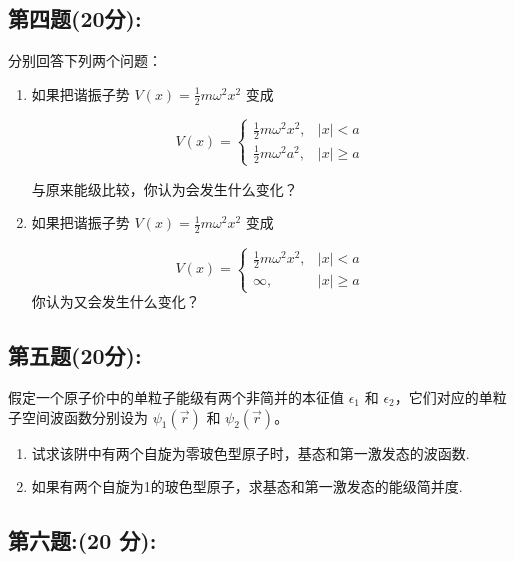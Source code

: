 \subsection{第四题(20分):}
分别回答下列两个问题：

\begin{enumerate}
    \item  如果把谐振子势 $V(x) = \frac{1}{2} m \omega^2 x^2$ 变成

    \[
    V(x) =
    \begin{cases}
    \frac{1}{2} m \omega^2 x^2, & |x| < a \\
    \frac{1}{2} m \omega^2 a^2, & |x| \geq a
    \end{cases}~
    \]

    与原来能级比较，你认为会发生什么变化？

    \item  如果把谐振子势 $V(x) = \frac{1}{2} m \omega^2 x^2$ 变成

    \[
    V(x) =
    \begin{cases}
    \frac{1}{2} m \omega^2 x^2, & |x| < a \\
    \infty, & |x| \geq a
    \end{cases}~
    \]
    你认为又会发生什么变化？
\end{enumerate}
\subsection{第五题(20分):}
假定一个原子价中的单粒子能级有两个非简并的本征值 $\epsilon_1$ 和 $\epsilon_2$，它们对应的单粒子空间波函数分别设为 $\psi_1(\vec r)$ 和 $\psi_2(\vec r)$。

\begin{enumerate}
    \item  试求该阱中有两个自旋为零玻色型原子时，基态和第一激发态的波函数.
    \item  如果有两个自旋为1的玻色型原子，求基态和第一激发态的能级简并度.
\end{enumerate}
\subsection{第六题:(20 分):}